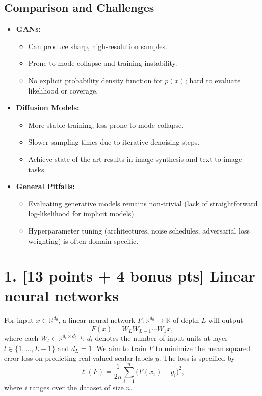 \documentclass[twocolumn]{article}
\begin{document}
\begin{spacing}{1}
\subsection{Comparison and Challenges}
\begin{itemize}
    \item \textbf{GANs:}
    \begin{itemize}
        \item Can produce sharp, high-resolution samples.
        \item Prone to mode collapse and training instability.
        \item No explicit probability density function for $p(x)$; hard to evaluate likelihood or coverage.
    \end{itemize}
    \item \textbf{Diffusion Models:}
    \begin{itemize}
        \item More stable training, less prone to mode collapse.
        \item Slower sampling times due to iterative denoising steps.
        \item Achieve state-of-the-art results in image synthesis and text-to-image tasks.
    \end{itemize}
    \item \textbf{General Pitfalls:}
    \begin{itemize}
        \item Evaluating generative models remains non-trivial (lack of straightforward log-likelihood for implicit models).
        \item Hyperparameter tuning (architectures, noise schedules, adversarial loss weighting) is often domain-specific.
    \end{itemize}
\end{itemize}

\section{1. [13 points + 4 bonus pts] Linear neural networks}

For input \(x \in \mathbb{R}^{d_0}\), a linear neural network \(F : \mathbb{R}^{d_0} \to \mathbb{R}\) of depth \(L\) will output
\[
F(x) = W_L W_{L-1} \cdots W_1 x,
\]
where each \(W_l \in \mathbb{R}^{d_l \times d_{l-1}}\); \(d_l\) denotes the number of input units at layer \(l \in \{1, \ldots, L-1\}\) and \(d_L = 1.\)
We aim to train \(F\) to minimize the mean squared error loss on predicting real-valued scalar labels \(y.\)
The loss is specified by
\[
\ell(F) = \frac{1}{2n} \sum_{i=1}^{n} \bigl(F(x_i) - y_i \bigr)^2,
\]
where \(i\) ranges over the dataset of size \(n\).


\end{spacing}
\end{document}
